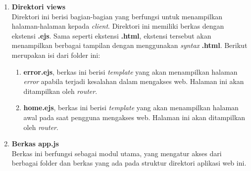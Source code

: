 \begin{enumerate}
	\item \textbf{Direktori views} \\	
	Direktori ini berisi bagian-bagian yang berfungsi untuk menampilkan halaman-halaman kepada \textit{client}. Direktori ini memiliki berkas dengan ekstensi \textbf{.ejs}. Sama seperti ekstensi \textbf{.html}, ekstensi tersebut akan menampilkan berbagai tampilan dengan menggunakan \textit{syntax} \textbf{.html}. Berikut merupakan isi dari folder ini:
	
	\begin{enumerate}
		\item \textbf{error.ejs}, berkas ini berisi \textit{template} yang akan menampilkan halaman \textit{error} apabila terjadi kesalahan dalam mengakses web. Halaman ini akan ditampilkan oleh \textit{router}.
		
		\item \textbf{home.ejs}, berkas ini berisi \textit{template} yang akan menampilkan halaman awal pada saat pengguna mengakses web. Halaman ini akan ditampilkan oleh \textit{router}.
	\end{enumerate}
	
	\item \textbf{Berkas app.js} \\ 
	Berkas ini berfungsi sebagai modul utama, yang mengatur akses dari berbagai folder dan berkas yang ada pada struktur direktori aplikasi web ini.
	

\end{enumerate}
